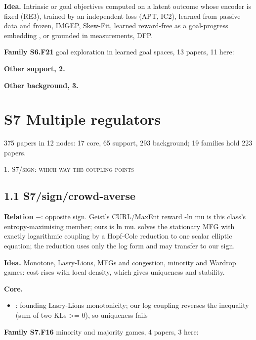 \documentclass[10pt]{article}
\newcommand{\memb}[1]{\par\smallskip\textbf{#1}\quad}
\begin{document}
\textbf{Idea.} Intrinsic or goal objectives computed on a latent outcome whose encoder is fixed (RE3), trained by an independent loss (APT, IC2), learned from passive data and frozen, IMGEP, Skew-Fit, learned reward-free as a goal-progress embedding \citep{Yu-unsupervised19}, or grounded in measurements, DFP.

\memb{Family S6.F21} goal exploration in learned goal spaces, 13 papers, 11 here: {\footnotesize \citetext{\citealp{Laversanne-Finot-curiosity18}; \citealp{Pere-unsupervised18}; \citealp{Pong-skew19}; \citealp{Forestier-intrinsically17}; \citealp{Nair-visual18}; \citealp{Cully-autonomous19}; \citealp{Paolo-unsupervised19}; \citealp{Colas-autotelic20}; \citealp{Grillotti-unsupervised21}; \citealp{Mendonca-discovering21}; \citealp{Islam-discrete22}}}

\memb{Other support, 2.} \citetext{\citealp{Dosovitskiy-learning17}; \citealp{Mazzaglia-curiosity21}}

\memb{Other background, 3.} {\footnotesize \citetext{\citealp{Vezzani-learning19}; \citealp{Yu-unsupervised19}; \citealp{Raileanu-ride20}}}

\section{S7 Multiple regulators}
375 papers in 12 nodes: 17 core, 65 support, 293 background; 19 families hold 223 papers.

\medskip\textsc{1. S7/sign: which way the coupling points}

\subsection{1.1 S7/sign/crowd-averse}\label{node:S7-S7-sign-crowd-averse}
\textbf{Relation} $-$: opposite sign. Geist's CURL/MaxEnt reward -ln mu is this class's entropy-maximising member; ours is ln mu. \citet{Bakaryan-regularity23} solves the stationary MFG with exactly logarithmic coupling by a Hopf-Cole reduction to one scalar elliptic equation; the reduction uses only the log form and may transfer to our sign.

\textbf{Idea.} Monotone, Lasry-Lions, MFGs and congestion, minority and Wardrop games: cost rises with local density, which gives uniqueness and stability.

\memb{Core.}
\begin{itemize}[nosep,leftmargin=1.2em]
\item \citet{Lasry-mean07}: founding Lasry-Lions monotonicity; our log coupling reverses the inequality (sum of two KLs \textgreater{}= 0), so uniqueness fails
\end{itemize}
\memb{Family S7.F16} minority and majority games, 4 papers, 3 here: {\footnotesize \citetext{\citealp{Arthur-inductive94}; \citealp{Challet-emergence97}; \citealp{Marsili-exact00}}}
\end{document}
